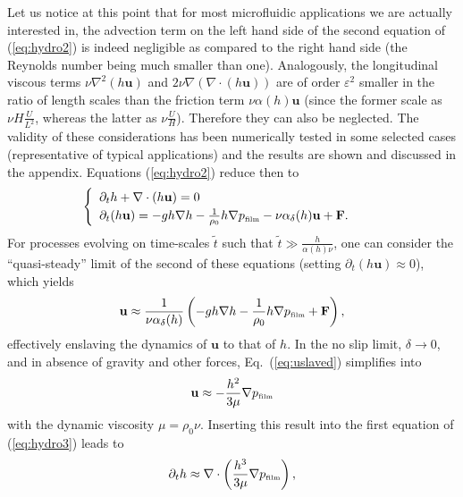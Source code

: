 Let us notice at this point that for most microfluidic applications we are actually
interested in, the advection term on the left hand side of the second equation of
(\ref{eq:hydro2}) is indeed negligible as compared to the right hand side
(the Reynolds number \cite{Reynolds,Sommerfeld} being much smaller than one).  
Analogously, the longitudinal viscous terms $\nu \nabla^2 (h\mathbf{u})$ and
$2\nu \nabla (\nabla \cdot (h\mathbf{u}))$ are of order $\varepsilon^2$ smaller 
in the ratio of length scales than the friction term $\nu \alpha(h) \mathbf{u}$
(since the former scale as $\nu H\frac{U}{L^2}$, whereas the latter as $\nu \frac{U}{H}$).
Therefore they can also be neglected.
The validity of these considerations has been numerically tested in some selected cases
(representative of typical applications) and the results are shown and discussed in the appendix.
Equations (\ref{eq:hydro2}) reduce then to
\begin{equation}\label{eq:hydro3}
\begin{cases}
\begin{array}{ll}
\partial_t h + \nabla \cdot (h \mathbf{u})  = 0 & \\ 
\partial_t (h \mathbf{u}) = -gh \nabla h -\frac{1}{\rho_0}h\nabla p_{\mbox{\tiny{film}}}
- \nu \alpha_{\delta}(h) \mathbf{u} + \mathbf{F}. 
\end{array}
\end{cases}
\end{equation}
For processes evolving on time-scales $\tilde{t}$ such that $\tilde{t}\gg \frac{h}{\alpha(h)\nu}$, one 
can consider the ``quasi-steady'' limit of the second of these equations 
(setting $\partial_t (h\mathbf{u}) \approx 0$), which yields
\begin{equation}\label{eq:uslaved}
\mathbf{u} \approx \frac{1}{\nu \alpha_{\delta}(h)}\left
(-gh \nabla h -\frac{1}{\rho_0}h\nabla p_{\mbox{\tiny{film}}} + \mathbf{F}\right),
\end{equation}
effectively enslaving the dynamics of $\mathbf{u}$ to that of $h$.
In the no slip limit, $\delta \rightarrow 0$, and in absence of gravity and other 
forces, Eq.~(\ref{eq:uslaved}) simplifies into
\begin{equation*}
\mathbf{u} \approx -\frac{h^2}{3 \mu}\nabla p_{\mbox{\tiny{film}}}
\end{equation*}
with the dynamic viscosity $\mu = \rho_0 \nu$. Inserting this result into the first equation of (\ref{eq:hydro3}) leads to
\begin{equation*}
\partial_t h \approx \nabla \cdot \left(\frac{h^3}{3\mu}\nabla p_{\mbox{\tiny{film}}}\right),
\end{equation*}
